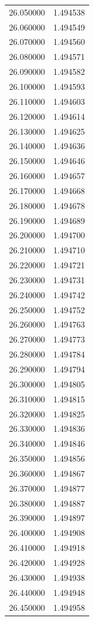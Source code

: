 \begin{tabular}{rr}
26.050000 & 1.494538 \\
26.060000 & 1.494549 \\
26.070000 & 1.494560 \\
26.080000 & 1.494571 \\
26.090000 & 1.494582 \\
26.100000 & 1.494593 \\
26.110000 & 1.494603 \\
26.120000 & 1.494614 \\
26.130000 & 1.494625 \\
26.140000 & 1.494636 \\
26.150000 & 1.494646 \\
26.160000 & 1.494657 \\
26.170000 & 1.494668 \\
26.180000 & 1.494678 \\
26.190000 & 1.494689 \\
26.200000 & 1.494700 \\
26.210000 & 1.494710 \\
26.220000 & 1.494721 \\
26.230000 & 1.494731 \\
26.240000 & 1.494742 \\
26.250000 & 1.494752 \\
26.260000 & 1.494763 \\
26.270000 & 1.494773 \\
26.280000 & 1.494784 \\
26.290000 & 1.494794 \\
26.300000 & 1.494805 \\
26.310000 & 1.494815 \\
26.320000 & 1.494825 \\
26.330000 & 1.494836 \\
26.340000 & 1.494846 \\
26.350000 & 1.494856 \\
26.360000 & 1.494867 \\
26.370000 & 1.494877 \\
26.380000 & 1.494887 \\
26.390000 & 1.494897 \\
26.400000 & 1.494908 \\
26.410000 & 1.494918 \\
26.420000 & 1.494928 \\
26.430000 & 1.494938 \\
26.440000 & 1.494948 \\
26.450000 & 1.494958 \\

\end{tabular}
